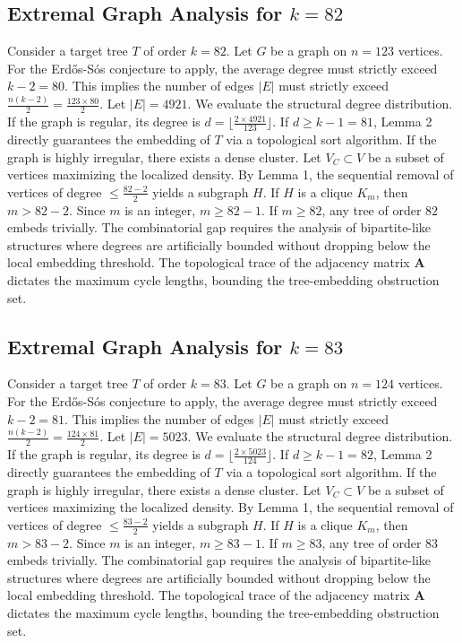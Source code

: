 \documentclass[11pt,a4paper]{article}
\begin{document}
\subsection{Extremal Graph Analysis for $k=82$}
Consider a target tree $T$ of order $k=82$.
Let $G$ be a graph on $n=123$ vertices.
For the Erd\H{o}s-S\'os conjecture to apply, the average degree must strictly exceed $k-2 = 80$.
This implies the number of edges $|E|$ must strictly exceed $\frac{n(k-2)}{2} = \frac{123 \times 80}{2}$.
Let $|E| = 4921$.
We evaluate the structural degree distribution. If the graph is regular, its degree is $d = \lfloor \frac{2 \times 4921}{123} \rfloor$.
If $d \geq k-1 = 81$, Lemma 2 directly guarantees the embedding of $T$ via a topological sort algorithm.
If the graph is highly irregular, there exists a dense cluster. Let $V_C \subset V$ be a subset of vertices maximizing the localized density.
By Lemma 1, the sequential removal of vertices of degree $\leq \frac{82-2}{2}$ yields a subgraph $H$.
If $H$ is a clique $K_{m}$, then $m > 82-2$. Since $m$ is an integer, $m \geq 82-1$. If $m \geq 82$, any tree of order $82$ embeds trivially.
The combinatorial gap requires the analysis of bipartite-like structures where degrees are artificially bounded without dropping below the local embedding threshold. The topological trace of the adjacency matrix $\mathbf{A}$ dictates the maximum cycle lengths, bounding the tree-embedding obstruction set.


\subsection{Extremal Graph Analysis for $k=83$}
Consider a target tree $T$ of order $k=83$.
Let $G$ be a graph on $n=124$ vertices.
For the Erd\H{o}s-S\'os conjecture to apply, the average degree must strictly exceed $k-2 = 81$.
This implies the number of edges $|E|$ must strictly exceed $\frac{n(k-2)}{2} = \frac{124 \times 81}{2}$.
Let $|E| = 5023$.
We evaluate the structural degree distribution. If the graph is regular, its degree is $d = \lfloor \frac{2 \times 5023}{124} \rfloor$.
If $d \geq k-1 = 82$, Lemma 2 directly guarantees the embedding of $T$ via a topological sort algorithm.
If the graph is highly irregular, there exists a dense cluster. Let $V_C \subset V$ be a subset of vertices maximizing the localized density.
By Lemma 1, the sequential removal of vertices of degree $\leq \frac{83-2}{2}$ yields a subgraph $H$.
If $H$ is a clique $K_{m}$, then $m > 83-2$. Since $m$ is an integer, $m \geq 83-1$. If $m \geq 83$, any tree of order $83$ embeds trivially.
The combinatorial gap requires the analysis of bipartite-like structures where degrees are artificially bounded without dropping below the local embedding threshold. The topological trace of the adjacency matrix $\mathbf{A}$ dictates the maximum cycle lengths, bounding the tree-embedding obstruction set.
\end{document}
